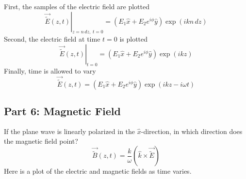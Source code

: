\documentclass{article}
\begin{document}
First, the samples of the electric field are plotted
\begin{equation}
    \left.\vec{\widetilde{E}}\left(z,t\right)\right\rvert_{z=n\,dz,\;t=0} = \left(E_1\hat{x} + E_2e^{i\phi}\hat{y}\right) \exp \left(ikn\,dz\right) 
\end{equation}
Second, the electric field at time $t=0$ is plotted
\begin{equation}
    \left.\vec{\widetilde{E}}\left(z,t\right)\right\rvert_{t=0} = \left(E_1\hat{x} + E_2e^{i\phi}\hat{y}\right) \exp \left(ikz\right)
\end{equation}
Finally, time is allowed to vary
\begin{equation}
    \vec{\widetilde{E}}\left(z,t\right) = \left(E_1\hat{x} + E_2e^{i\phi}\hat{y}\right) \exp \left(i kz - i \omega t\right)
\end{equation}
\subsection{Part 6: Magnetic Field}
If the plane wave is linearly polarized in the $\hat x$-direction, in which direction does the magnetic field point?
\begin{equation}
    \vec{\widetilde{B}}\left(z,t\right) =  \frac{k}{\omega} \left(\hat{k}\times\vec{\widetilde{E}}\right)
\end{equation}
Here is a plot of the electric and magnetic fields as time varies.
\end{document}
